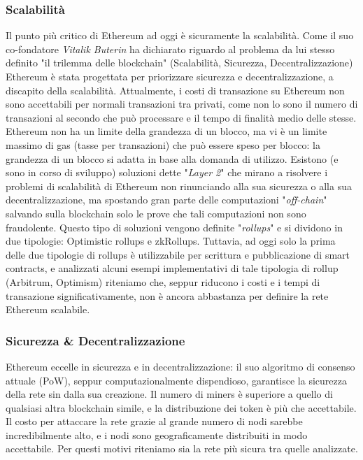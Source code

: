 \documentclass[a4paper, 12pt]{article}
\begin{document}
\subsubsection*{Scalabilità}
Il punto più critico di Ethereum ad oggi è sicuramente la scalabilità.
Come il suo co-fondatore \textit{Vitalik Buterin} ha dichiarato riguardo al problema da lui stesso definito "il trilemma delle blockchain" (Scalabilità, Sicurezza, Decentralizzazione)
Ethereum è stata progettata per priorizzare sicurezza e decentralizzazione, a discapito della scalabilità.
Attualmente, i costi di transazione su Ethereum non sono accettabili per normali transazioni tra privati, come non lo sono il numero di transazioni al secondo che può
processare e il tempo di finalità medio delle stesse.
Ethereum non ha un limite della grandezza di un blocco, ma vi è un limite massimo di gas (tasse per transazioni) che può essere speso per blocco: la grandezza di un blocco si adatta
in base alla domanda di utilizzo.
Esistono (e sono in corso di sviluppo) soluzioni dette "\textit{Layer 2}" che mirano a risolvere i problemi di scalabilità di Ethereum non rinunciando alla sua sicurezza
o alla sua decentralizzazione, ma spostando gran parte delle computazioni "\textit{off-chain}" salvando sulla blockchain solo le prove che tali computazioni non sono
fraudolente. Questo tipo di soluzioni vengono definite "\textit{rollups}" e si dividono in due tipologie: Optimistic rollups e zkRollups.
Tuttavia, ad oggi solo la prima delle due tipologie di rollups è utilizzabile per scrittura e pubblicazione di smart contracts, e analizzati alcuni esempi
implementativi di tale tipologia di rollup (Arbitrum, Optimism) riteniamo che, seppur riducono i costi e i tempi di transazione significativamente,
non è ancora abbastanza per definire la rete Ethereum scalabile.

\subsubsection*{Sicurezza \& Decentralizzazione}
Ethereum eccelle in sicurezza e in decentralizzazione: il suo algoritmo di consenso attuale (PoW), seppur computazionalmente dispendioso, garantisce la sicurezza della rete sin dalla sua creazione. Il numero di miners è superiore a quello di qualsiasi altra blockchain simile, e la distribuzione dei token è più che accettabile.
Il costo per attaccare la rete grazie al grande numero di nodi sarebbe incredibilmente alto, e i nodi sono geograficamente distribuiti in modo accettabile.
Per questi motivi riteniamo sia la rete più sicura tra quelle analizzate.
\end{document}
